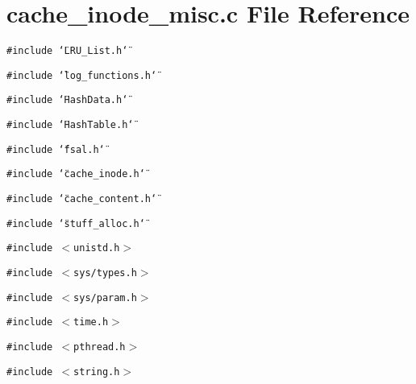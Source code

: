\section{cache\_\-inode\_\-misc.c File Reference}
\label{cache__inode__misc_8c}
{\tt \#include \char`\"{}LRU\_\-List.h\char`\"{}}\par
{\tt \#include \char`\"{}log\_\-functions.h\char`\"{}}\par
{\tt \#include \char`\"{}Hash\-Data.h\char`\"{}}\par
{\tt \#include \char`\"{}Hash\-Table.h\char`\"{}}\par
{\tt \#include \char`\"{}fsal.h\char`\"{}}\par
{\tt \#include \char`\"{}cache\_\-inode.h\char`\"{}}\par
{\tt \#include \char`\"{}cache\_\-content.h\char`\"{}}\par
{\tt \#include \char`\"{}stuff\_\-alloc.h\char`\"{}}\par
{\tt \#include $<$unistd.h$>$}\par
{\tt \#include $<$sys/types.h$>$}\par
{\tt \#include $<$sys/param.h$>$}\par
{\tt \#include $<$time.h$>$}\par
{\tt \#include $<$pthread.h$>$}\par
{\tt \#include $<$string.h$>$}\par

